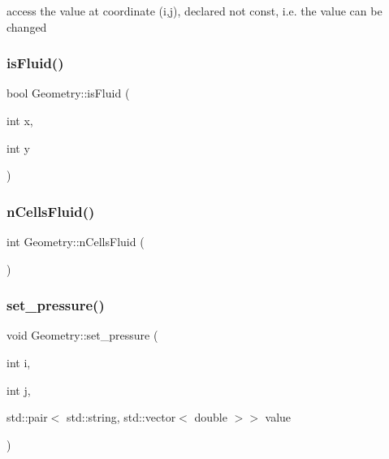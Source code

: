 access the value at coordinate (i,j), declared not const, i.\+e. the value can be changed 

\mbox{\label{classGeometry_a7d7f8a422408127b3944481b492c148d}} 
\subsubsection{\texorpdfstring{isFluid()}{isFluid()}}
{\footnotesize\ttfamily bool Geometry\+::is\+Fluid (\begin{DoxyParamCaption}\item[{int}]{x,  }\item[{int}]{y }\end{DoxyParamCaption})}

\mbox{\label{classGeometry_aab2e9744e6d686399d39ceb578aaa8dc}} 
\subsubsection{\texorpdfstring{nCellsFluid()}{nCellsFluid()}}
{\footnotesize\ttfamily int Geometry\+::n\+Cells\+Fluid (\begin{DoxyParamCaption}{ }\end{DoxyParamCaption})}

\mbox{\label{classGeometry_a4e9e036f5404003ce4ef3f01532d58ad}} 
\subsubsection{\texorpdfstring{set\_pressure()}{set\_pressure()}}
{\footnotesize\ttfamily void Geometry\+::set\+\_\+pressure (\begin{DoxyParamCaption}\item[{int}]{i,  }\item[{int}]{j,  }\item[{std\+::pair$<$ std\+::string, std\+::vector$<$ double $>$$>$}]{value }\end{DoxyParamCaption})}

\mbox{\label{classGeometry_a4e8466505940c4c7ec5f587c0410ef57}} 
